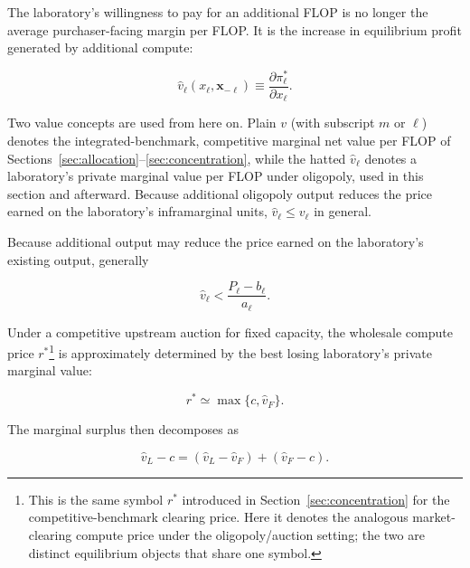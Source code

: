\documentclass[11pt]{article}
\begin{document}
The laboratory's willingness to pay for an additional FLOP is no longer the average purchaser-facing margin per FLOP. It is the increase in equilibrium profit generated by additional compute:

\begin{equation}\label{eq:vhat-def}\widehat v_\ell(x_\ell,\mathbf x_{-\ell})\equiv\frac{\partial\pi_\ell^*}{\partial x_\ell}.\end{equation}

Two value concepts are used from here on. Plain $v$ (with subscript $m$ or $\ell$) denotes the integrated-benchmark, competitive marginal net value per FLOP of Sections~\ref{sec:allocation}--\ref{sec:concentration}, while the hatted $\widehat v_\ell$ denotes a laboratory's private marginal value per FLOP under oligopoly, used in this section and afterward. Because additional oligopoly output reduces the price earned on the laboratory's inframarginal units, $\widehat v_\ell\leq v_\ell$ in general.

Because additional output may reduce the price earned on the laboratory's existing output, generally

\begin{equation}\widehat v_\ell<\frac{P_\ell-b_\ell}{a_\ell}.\end{equation}

Under a competitive upstream auction for fixed capacity, the wholesale compute price $r^*$\footnote{This is the same symbol $r^*$ introduced in Section~\ref{sec:concentration} for the competitive-benchmark clearing price. Here it denotes the analogous market-clearing compute price under the oligopoly/auction setting; the two are distinct equilibrium objects that share one symbol.} is approximately determined by the best losing laboratory's private marginal value:

\begin{equation}r^*\simeq\max\{c,\widehat v_F\}.\end{equation}

The marginal surplus then decomposes as

\begin{equation}\widehat v_L-c=\left(\widehat v_L-\widehat v_F\right)+\left(\widehat v_F-c\right).\end{equation}
\end{document}
